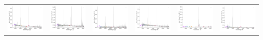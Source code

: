\begin{center}
\begin{longtable}{l l l l l l }
    \includegraphics[width=0.3\linewidth, clip]{Figs/Figs-sdss/spec-1033-52822-0623-STRIPE82-0134-016856.pdf} & \includegraphics[width=0.3\linewidth, clip]{Figs/Figs-sdss/spec-1035-52816-0289-SPLUS-s02s08-035461.pdf} & \includegraphics[width=0.3\linewidth, clip]{Figs/Figs-sdss/spec-1068-52614-0292-STRIPE82-0061-011616.pdf} & \includegraphics[width=0.3\linewidth, clip]{Figs/Figs-sdss/spec-1068-52614-0500-STRIPE82-0064-029944.pdf} & \includegraphics[width=0.3\linewidth, clip]{Figs/Figs-sdss/spec-1069-52590-0193-STRIPE82-0059-041056.pdf} & \includegraphics[width=0.3\linewidth, clip]{Figs/Figs-sdss/spec-1071-52641-0013-STRIPE82-0057-050992.pdf} \\

\end{longtable}
\end{center}
